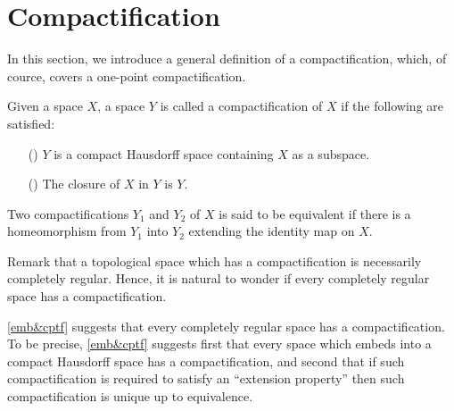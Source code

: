 \section{Compactification}

In this section, we introduce a general definition of a compactification, which, of cource, covers a one-point compactification.
\begin{defi}[Compactification]
    Given a space $X$, a space $Y$ is called a compactification of $X$ if the following are satisfied:
    \begin{enumerate}
        \item[(\romannumeral 1)]
        {
            $Y$ is a compact Hausdorff space containing $X$ as a subspace.
        }
        \item[(\romannumeral 2)]
        {
            The closure of $X$ in $Y$ is $Y$.
        }
    \end{enumerate}
    Two compactifications $Y_1$ and $Y_2$ of $X$ is said to be equivalent if there is a homeomorphism from $Y_1$ into $Y_2$ extending the identity map on $X$.
\end{defi}
\begin{rmk}
    Remark that a topological space which has a compactification is necessarily completely regular.
    Hence, it is natural to wonder if every completely regular space has a compactification.
\end{rmk}
\cref{emb&cptf} suggests that every completely regular space has a compactification.
To be precise, \cref{emb&cptf} suggests first that every space which embeds into a compact Hausdorff space has a compactification, and second that if such compactification is required to satisfy an ``extension property'' then such compactification is unique up to equivalence.

